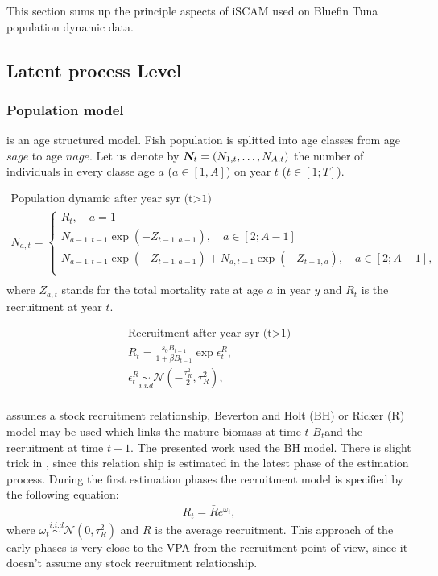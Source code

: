 This section  sums up the principle  aspects of iSCAM used  on Bluefin
Tuna population dynamic data.
\subsection{Latent process Level}
\subsubsection{Population model}
\iscam is an age structured model.  Fish population is splitted into age classes from
age $sage$ to age $nage$. Let us denote by $\boldsymbol N_t = (N_{1,t}, \ldots, N_{A,t})$ the number
of individuals in every classe age $a$ ($a\in [1,A]$) on year $t$ ($t\in [1;T]$).

\begin{gather}
  \mbox{Population dynamic after year syr (t>1)}\\
  N_{a,t}= \left\lbrace 
    \begin{array}{l}
      R_t, \quad a=1\\
      N_{a-1,t-1} \exp(-Z_{t-1, a-1}), \quad a\in [2;A-1]\\
      N_{a-1,t-1} \exp(-Z_{t-1, a-1}) + N_{a,t-1} \exp(-Z_{t-1, a}), \quad a\in [2;A-1],\\
    \end{array}  \right. \\
\end{gather}
 where $Z_{a,t}$  stands for the total  mortality rate at age  $a$ in
  year $y$ and $R_t$ is the recruitment at year $t$.




\begin{gather}
\mbox{Recruitment after year syr (t>1)}\\
R_t= \frac{s_0 B_{t-1}}{1+\beta B_{t-1}} \exp{\epsilon^R_t}, \\
\epsilon^R_t\underset{i.i.d}{\sim}\mathcal{N}\left(-\frac{\tau_R^2}{2}, \tau_R^2\right),\\
\label{eq:iscamBev}
\end{gather} 

\iscam assumes a stock recruitment relationship, Beverton and Holt
(BH) or Ricker (R) model may be used which links the mature biomass at
time $t$ $B_t$and the recruitment at time $t+1$. The presented work used the BH model. 
There is slight trick in \iscam, since this relation ship is estimated
in the latest phase of the estimation process. During the first estimation phases the recruitment
model is specified by the following equation:
\begin{gather}
\label{eq:iscamRec}  R_t =\bar{R}e^{\omega_t},
\end{gather}
where  $\omega_t\overset{i.i.d}{\sim}  \mathcal{N}(0,  \tau^2_R)$  and
$\bar{R}$ is the average recruitment. This
approach  of the  early  phases is  very  close to  the  VPA from  the
recruitment  point  of  view,  since   it  doesn't  assume  any  stock
recruitment relationship. 


